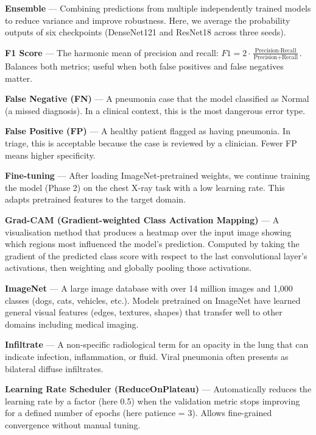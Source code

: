 \documentclass[12pt,a4paper]{article}
\begin{document}
\begin{tcolorbox}[glossbox={Key Terms Explained}]
\medskip
\textbf{Ensemble} --- Combining predictions from multiple independently trained models to reduce variance and improve robustness. Here, we average the probability outputs of six checkpoints (DenseNet121 and ResNet18 across three seeds).

\medskip
\textbf{F1 Score} --- The harmonic mean of precision and recall: $F1 = 2 \cdot \frac{\text{Precision} \cdot \text{Recall}}{\text{Precision} + \text{Recall}}$. Balances both metrics; useful when both false positives and false negatives matter.

\medskip
\textbf{False Negative (FN)} --- A pneumonia case that the model classified as Normal (a missed diagnosis). In a clinical context, this is the most dangerous error type.

\medskip
\textbf{False Positive (FP)} --- A healthy patient flagged as having pneumonia. In triage, this is acceptable because the case is reviewed by a clinician. Fewer FP means higher specificity.

\medskip
\textbf{Fine-tuning} --- After loading ImageNet-pretrained weights, we continue training the model (Phase 2) on the chest X-ray task with a low learning rate. This adapts pretrained features to the target domain.

\medskip
\textbf{Grad-CAM (Gradient-weighted Class Activation Mapping)} --- A visualisation method that produces a heatmap over the input image showing which regions most influenced the model's prediction. Computed by taking the gradient of the predicted class score with respect to the last convolutional layer's activations, then weighting and globally pooling those activations.

\medskip
\textbf{ImageNet} --- A large image database with over 14 million images and 1,000 classes (dogs, cats, vehicles, etc.). Models pretrained on ImageNet have learned general visual features (edges, textures, shapes) that transfer well to other domains including medical imaging.

\medskip
\textbf{Infiltrate} --- A non-specific radiological term for an opacity in the lung that can indicate infection, inflammation, or fluid. Viral pneumonia often presents as bilateral diffuse infiltrates.

\medskip
\textbf{Learning Rate Scheduler (ReduceOnPlateau)} --- Automatically reduces the learning rate by a factor (here 0.5) when the validation metric stops improving for a defined number of epochs (here patience = 3). Allows fine-grained convergence without manual tuning.


\end{tcolorbox}
\end{document}
